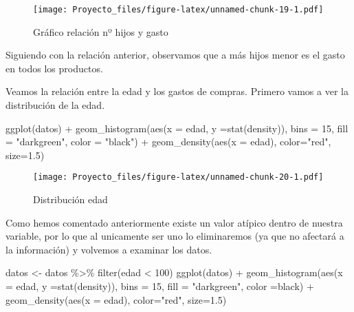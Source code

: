 \documentclass[
]{article}
\newenvironment{Shaded}{\begin{snugshade}}{\end{snugshade}}
\newcommand{\AttributeTok}[1]{\textcolor[rgb]{0.77,0.63,0.00}{#1}}
\newcommand{\DecValTok}[1]{\textcolor[rgb]{0.00,0.00,0.81}{#1}}
\newcommand{\FloatTok}[1]{\textcolor[rgb]{0.00,0.00,0.81}{#1}}
\newcommand{\FunctionTok}[1]{\textcolor[rgb]{0.00,0.00,0.00}{#1}}
\newcommand{\NormalTok}[1]{#1}
\newcommand{\OtherTok}[1]{\textcolor[rgb]{0.56,0.35,0.01}{#1}}
\newcommand{\SpecialCharTok}[1]{\textcolor[rgb]{0.00,0.00,0.00}{#1}}
\newcommand{\StringTok}[1]{\textcolor[rgb]{0.31,0.60,0.02}{#1}}
\begin{document}
\begin{figure}
\centering
\texttt{[image: Proyecto\_files/figure-latex/unnamed-chunk-19-1.pdf]}
\caption{Gráfico relación nº hijos y gasto}
\end{figure}

Siguiendo con la relación anterior, observamos que a más hijos menor es
el gasto en todos los productos.

Veamos la relación entre la edad y los gastos de compras. Primero vamos
a ver la distribución de la edad.

\begin{Shaded}
\begin{Highlighting}[]
\FunctionTok{ggplot}\NormalTok{(datos) }\SpecialCharTok{+}
  \FunctionTok{geom\_histogram}\NormalTok{(}\FunctionTok{aes}\NormalTok{(}\AttributeTok{x =}\NormalTok{ edad, }\AttributeTok{y =}\FunctionTok{stat}\NormalTok{(density)), }\AttributeTok{bins =} \DecValTok{15}\NormalTok{, }\AttributeTok{fill =} \StringTok{"darkgreen"}\NormalTok{, }
                 \AttributeTok{color =} \StringTok{"black"}\NormalTok{) }\SpecialCharTok{+}
  \FunctionTok{geom\_density}\NormalTok{(}\FunctionTok{aes}\NormalTok{(}\AttributeTok{x =}\NormalTok{ edad), }\AttributeTok{color=}\StringTok{"red"}\NormalTok{, }\AttributeTok{size=}\FloatTok{1.5}\NormalTok{)}
\end{Highlighting}
\end{Shaded}

\begin{figure}
\centering
\texttt{[image: Proyecto\_files/figure-latex/unnamed-chunk-20-1.pdf]}
\caption{Distribución edad}
\end{figure}

Como hemos comentado anteriormente existe un valor atípico dentro de
nuestra variable, por lo que al unicamente ser uno lo eliminaremos (ya
que no afectará a la información) y volvemos a examinar los datos.

\begin{Shaded}
\begin{Highlighting}[]
\NormalTok{datos }\OtherTok{\textless{}{-}}\NormalTok{ datos }\SpecialCharTok{\%\textgreater{}\%}
  \FunctionTok{filter}\NormalTok{(edad }\SpecialCharTok{\textless{}} \DecValTok{100}\NormalTok{)}
\FunctionTok{ggplot}\NormalTok{(datos) }\SpecialCharTok{+}
  \FunctionTok{geom\_histogram}\NormalTok{(}\FunctionTok{aes}\NormalTok{(}\AttributeTok{x =}\NormalTok{ edad, }\AttributeTok{y =}\FunctionTok{stat}\NormalTok{(density)), }\AttributeTok{bins =} \DecValTok{15}\NormalTok{, }\AttributeTok{fill =} \StringTok{"darkgreen"}\NormalTok{,}
                 \AttributeTok{color =}\StringTok{\textquotesingle{}black\textquotesingle{}}\NormalTok{) }\SpecialCharTok{+}
  \FunctionTok{geom\_density}\NormalTok{(}\FunctionTok{aes}\NormalTok{(}\AttributeTok{x =}\NormalTok{ edad), }\AttributeTok{color=}\StringTok{"red"}\NormalTok{, }\AttributeTok{size=}\FloatTok{1.5}\NormalTok{)}
\end{Highlighting}
\end{Shaded}
\end{document}
